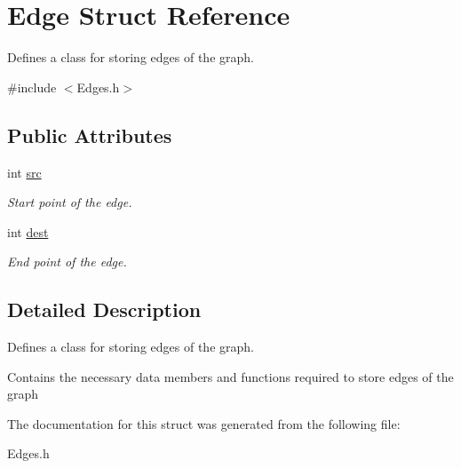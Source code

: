 \hypertarget{struct_edge}{}\section{Edge Struct Reference}
\label{struct_edge}


Defines a class for storing edges of the graph.  




{\ttfamily \#include $<$Edges.\+h$>$}

\subsection*{Public Attributes}
\begin{DoxyCompactItemize}
\item 
\mbox{\label{struct_edge_a9a415f211c059647d1b3af8fcf7a0e30}} 
int \mbox{\hyperlink{struct_edge_a9a415f211c059647d1b3af8fcf7a0e30}{src}}
\begin{DoxyCompactList}\small\item\em Start point of the edge. \end{DoxyCompactList}\item 
\mbox{\label{struct_edge_ad7df434ff7710e69f28bb31e91a35f82}} 
int \mbox{\hyperlink{struct_edge_ad7df434ff7710e69f28bb31e91a35f82}{dest}}
\begin{DoxyCompactList}\small\item\em End point of the edge. \end{DoxyCompactList}\end{DoxyCompactItemize}


\subsection{Detailed Description}
Defines a class for storing edges of the graph. 

Contains the necessary data members and functions required to store edges of the graph 

The documentation for this struct was generated from the following file\+:\begin{DoxyCompactItemize}
\item 
Edges.\+h\end{DoxyCompactItemize}

